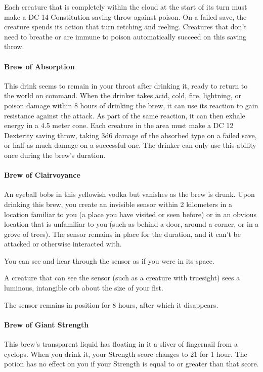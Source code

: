         Each creature that is completely within the cloud at the start of its turn must make a DC 14 Constitution saving throw against poison.
        On a failed save, the creature spends its action that turn retching and reeling.
        Creatures that don't need to breathe or are immune to poison automatically succeed on this saving throw.
    \paragraph{Brew of Absorption} %
        This drink seems to remain in your throat after drinking it, ready to return to the world on command.
        When the drinker takes acid, cold, fire, lightning, or poison damage within 8 hours of drinking the brew, it can use its reaction to gain resistance against the attack.
        As part of the same reaction, it can then exhale energy in a 4.5 meter cone.
        Each creature in the area must make a DC 12 Dexterity saving throw, taking 3d6 damage of the absorbed type on a failed save, or half as much damage on a successful one.
        The drinker can only use this ability once during the brew's duration.
    \paragraph{Brew of Clairvoyance} %
        An eyeball bobs in this yellowish vodka but vanishes as the brew is drunk.
        Upon drinking this brew, you create an invisible sensor within 2 kilometers in a location familiar to you (a place you have visited or seen before) or in an obvious location that is unfamiliar to you (such as behind a door, around a corner, or in a grove of trees).
        The sensor remains in place for the duration, and it can't be attacked or otherwise interacted with.

        You can see and hear through the sensor as if you were in its space.

        A creature that can see the sensor (such as a creature with truesight) sees a luminous, intangible orb about the size of your fist.

        The sensor remains in position for 8 hours, after which it disappears.
    \paragraph{Brew of Giant Strength}
        This brew's transparent liquid has floating in it a sliver of fingernail from a cyclops.
        When you drink it, your Strength score changes to 21 for 1 hour.
        The potion has no effect on you if your Strength is equal to or greater than that score.
